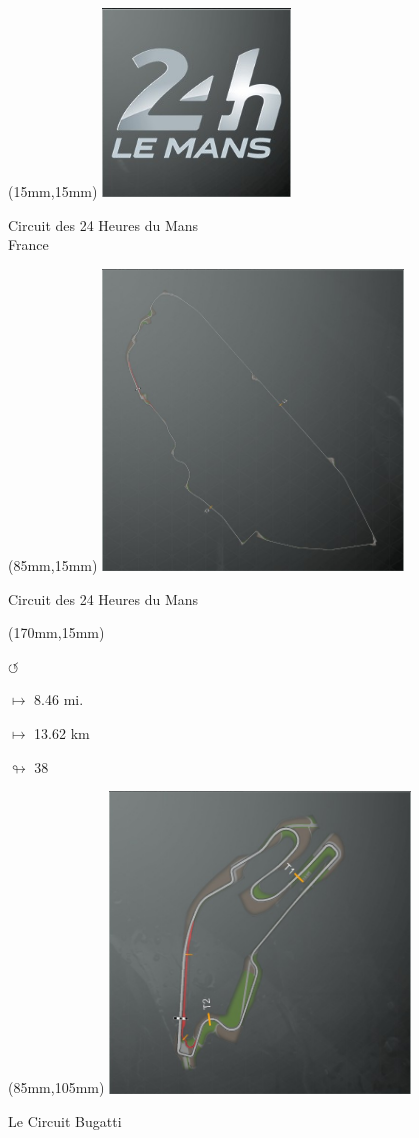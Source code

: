 \begin{textblock*}{60mm}(15mm,15mm)%
\includegraphics[width=50mm]{LG/2015-05-20_00084.png}
\par Circuit des 24 Heures du Mans\\ France
\end{textblock*}
\begin{textblock*}{80mm}(85mm,15mm)%
\includegraphics[width=80mm]{TR/2015-05-20_00031.png}
\centerline{Circuit des 24 Heures du Mans}
\end{textblock*}
\begin{textblock*}{30mm}(170mm,15mm)%
\par \Huge$\circlearrowleft$
\Large
\par$\mapsto$ 8.46 mi.
\par$\mapsto$ 13.62 km
\par$\looparrowright$ 38
\end{textblock*}
\begin{textblock*}{80mm}(85mm,105mm)%
\includegraphics[width=80mm]{TR/2015-05-20_00032.png}
\centerline{Le Circuit Bugatti}
\end{textblock*}
